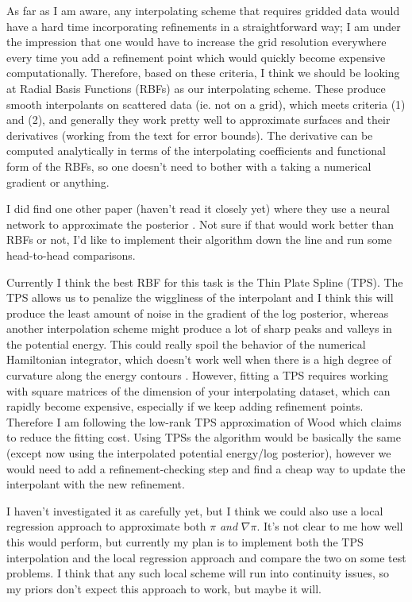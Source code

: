 \documentclass[12pt,a4paper]{article}
\begin{document}
As far as I am aware, any interpolating scheme that requires gridded data would have a hard time incorporating refinements in a straightforward way; I am under the impression that one  would have to increase the grid resolution everywhere every time you add a refinement point which would quickly become expensive computationally.  Therefore, based on these criteria, I think we should be looking at Radial Basis Functions (RBFs) as our interpolating scheme.  These produce smooth interpolants on scattered data (ie. not on a grid), which meets criteria (1) and (2), and generally they work pretty well to approximate surfaces and their derivatives (working from the text \cite{buhmann_radial_2003} for error bounds).  The derivative can be computed analytically in terms of the interpolating coefficients and functional form of the RBFs, so one doesn't need to bother with a taking a numerical gradient or anything.  

I did find one other paper (haven't read it closely yet) where they use a neural network to approximate the posterior \parencite{zhang_hamiltonian_2015}.  Not sure if that would work better than RBFs or not, I'd like to implement their algorithm down the line and run some head-to-head comparisons.

Currently I think the best RBF for this task is the Thin Plate Spline (TPS).  The TPS allows us to penalize the wiggliness of the interpolant and I think this will produce the least amount of noise in the gradient of the log posterior, whereas another interpolation scheme might produce a lot of sharp peaks and valleys in the potential energy.  This could really spoil the behavior of the numerical Hamiltonian integrator, which doesn't work well when there is a high degree of curvature along the energy contours \parencite{betancourt_geometric_2014}.  However, fitting a TPS requires working with square matrices of the dimension of your interpolating dataset, which can rapidly become expensive, especially if we keep adding refinement points.  Therefore I am following the low-rank TPS approximation of Wood \parencite{wood_thin_2003} which claims to reduce the fitting cost.  Using TPSs the algorithm would be basically the same (except now using the interpolated potential energy/log posterior), however we would need to add a refinement-checking step and find a cheap way to update the interpolant with the new refinement.

I haven't investigated it as carefully yet, but I think we could also use a local regression approach to approximate both $\pi$ \textit{and} $\nabla \pi$.  It's not clear to me how well this would perform, but currently my plan is to implement both the TPS interpolation and the local regression approach and compare the two on some test problems.  I think that any such local scheme will run into continuity issues, so my priors don't expect this approach to work, but maybe it will.
\end{document}
